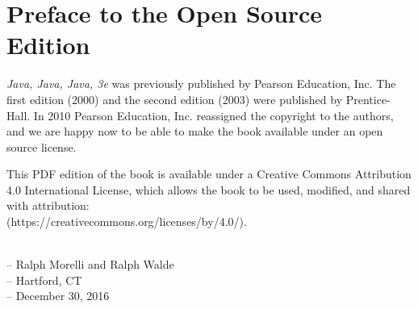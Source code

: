 \chapter*{Preface to the Open Source Edition}

{\em Java, Java, Java, 3e} was previously published by Pearson
Education, Inc.   The first edition (2000) and the second
edition (2003) were published by Prentice-Hall.  In 2010
Pearson Education, Inc. reassigned the copyright to
the authors, and we are happy now to be able to make the
book available under an open source license.

This PDF edition of the book is available under a Creative Commons
Attribution 4.0 International License, which allows the
book to be used, modified, and shared with attribution:
\\(https://creativecommons.org/licenses/by/4.0/).


\noindent
\\-- Ralph Morelli and Ralph Walde
\noindent
\\-- Hartford, CT
\noindent
\\-- December 30, 2016
